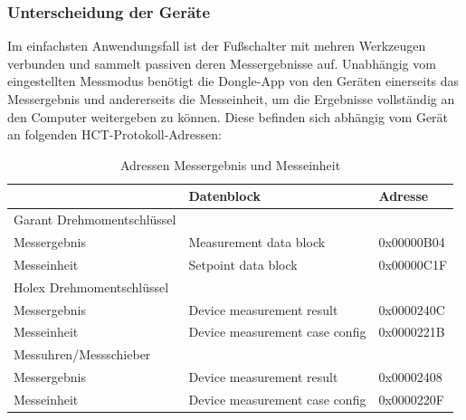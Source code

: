 \subsubsection{Unterscheidung der Geräte}
Im einfachsten Anwendungsfall ist der Fußschalter mit mehren Werkzeugen verbunden und sammelt passiven deren Messergebnisse auf. Unabhängig vom eingestellten Messmodus benötigt die Dongle-App von den Geräten einerseits das Messergebnis und andererseits die Messeinheit, um die Ergebnisse vollständig an den Computer weitergeben zu können. Diese befinden sich abhängig vom Gerät an folgenden \ac{HCT}-Protokoll-Adressen:

\begin{table}[H]
	\centering
	\begin{tabular}[H]{l|l|l}
		 & Datenblock & Adresse \\
		\hline
		Garant Drehmomentschlüssel & & \\
		Messergebnis & Measurement data block & 0x00000B04 \\
		Messeinheit & Setpoint data block & 0x00000C1F \\
		\hline
		Holex Drehmomentschlüssel & & \\
		Messergebnis & Device measurement result & 0x0000240C \\
		Messeinheit & Device measurement case config & 0x0000221B \\
		\hline
		Messuhren/Messschieber & & \\
		Messergebnis & Device measurement result & 0x00002408 \\
		Messeinheit & Device measurement case config & 0x0000220F \\
	\end{tabular}
	\caption{Adressen Messergebnis und Messeinheit}
\end{table}

